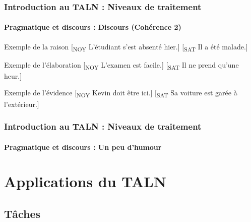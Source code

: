 \documentclass[xcolor=table]{beamer}
\begin{document}
\begin{frame}
\frametitle{Introduction au TALN : Niveaux de traitement}
\framesubtitle{Pragmatique et discours : Discours (Cohérence 2)}

\begin{exampleblock}{Exemple de la raison}
	[\textsubscript{NOY} L'étudiant s'est absenté hier.] [\textsubscript{SAT} Il a été malade.]
\end{exampleblock}

\begin{exampleblock}{Exemple de l'élaboration}
	[\textsubscript{NOY} L'examen est facile.] [\textsubscript{SAT} Il ne prend qu'une heur.]
\end{exampleblock}

\begin{exampleblock}{Exemple de l'évidence}
	[\textsubscript{NOY} Kevin doit être ici.] [\textsubscript{SAT} Sa voiture est garée à l'extérieur.]
\end{exampleblock}


\end{frame}

\begin{frame}
\frametitle{Introduction au TALN : Niveaux de traitement}
\framesubtitle{Pragmatique et discours : Un peu d'humour}

\begin{center}
\end{center}

\end{frame}

\section{Applications du TALN}

%

\subsection{Tâches}
\end{document}
